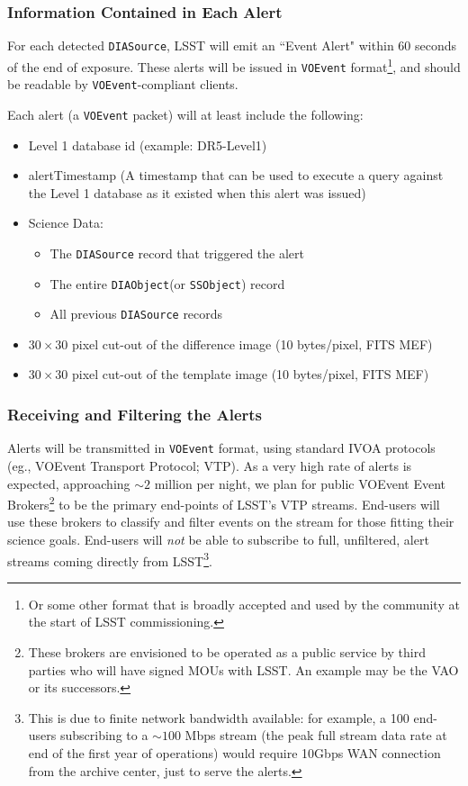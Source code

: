 \documentclass[12pt]{article}
\newcommand{\code}[1]{\texttt{#1}}
\newcommand{\DIASource}{\code{DIASource}\xspace}
\newcommand{\DIAObject}{\code{DIAObject}\xspace}
\newcommand{\DB}{{Level 1 database}\xspace}
\newcommand{\SSObject}{\code{SSObject}\xspace}
\newcommand{\VOEvent}{\code{VOEvent}\xspace}
\begin{document}
\subsubsection{Information Contained in Each Alert}

For each detected \DIASource, LSST will emit an ``Event Alert" within 60
seconds of the end of exposure. These alerts will be issued in \VOEvent
format\footnote{Or some other format that is broadly accepted and used by the
community at the start of LSST commissioning.}, and should be readable by
\VOEvent-compliant clients.

\vspace{1em}
Each alert (a \VOEvent packet) will at least include the following:

\begin{itemize}
\item \DB id (example: DR5-Level1)
\item alertTimestamp (A timestamp that can be used to execute a query against
      the \DB as it existed when this alert was issued)
\item Science Data:
    \begin{itemize}
    \item The \DIASource record that triggered the alert
    \item The entire \DIAObject (or \SSObject) record
    \item All previous \DIASource records
    \end{itemize}
\item $30\times 30$ pixel cut-out of the difference image (10 bytes/pixel, FITS MEF)
\item $30\times 30$ pixel cut-out of the template image (10 bytes/pixel, FITS MEF)
\end{itemize}

\subsubsection{Receiving and Filtering the Alerts}
\label{sec:eventbrokers}

Alerts will be transmitted in \VOEvent format, using standard IVOA protocols
(eg., VOEvent Transport Protocol; VTP). As a very high rate of alerts is
expected, approaching $\sim 2$ million per night, we plan for public VOEvent
Event Brokers\footnote{These brokers are envisioned to be operated as a public
service by third parties who will have signed MOUs with LSST. An example may
be the VAO or its successors.} to be the primary end-points of LSST's VTP
streams. End-users will use these brokers to classify and filter events on the
stream for those fitting their science goals. End-users will {\em not} be able
to subscribe to full, unfiltered, alert streams coming directly from
LSST\footnote{This is due to finite network bandwidth available: for example,
a 100 end-users subscribing to a $\sim 100$ Mbps stream (the peak full stream
data rate at end of the first year of operations) would require 10Gbps WAN
connection from the archive center, just to serve the alerts.}.
\end{document}
